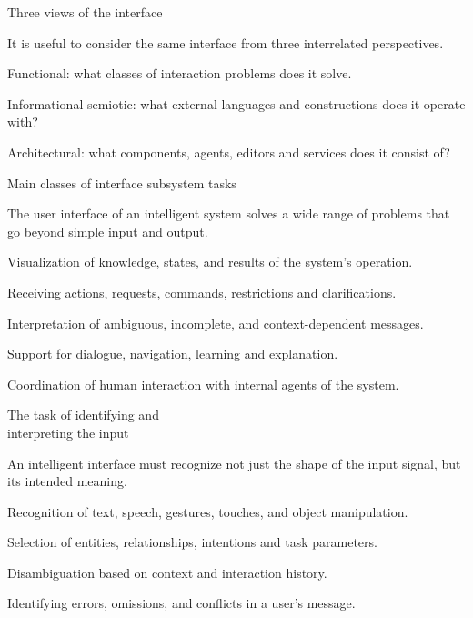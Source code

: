 \begin{frame}{Three views of the interface}
	\topline
	\justifying
	
	
	It is useful to consider the same interface from three interrelated perspectives.
	
	\begin{textitemize}
		\item Functional: what classes of interaction problems does it solve.
		\item Informational-semiotic: what external languages and constructions does it operate with?
		\item Architectural: what components, agents, editors and services does it consist of?
	\end{textitemize}
\end{frame}

\begin{frame}{Main classes of interface subsystem tasks}
	\topline
	\justifying
	
	The user interface of an intelligent system solves a wide range of problems that go beyond simple input and output.
	
	\begin{textitemize}
		\item Visualization of knowledge, states, and results of the system's operation.
		\item Receiving actions, requests, commands, restrictions and clarifications.
		\item Interpretation of ambiguous, incomplete, and context-dependent messages.
		\item Support for dialogue, navigation, learning and explanation.
		\item Coordination of human interaction with internal agents of the system.
	\end{textitemize}
\end{frame}

\begin{frame}{The task of identifying and\\ interpreting the input}
	\topline
	\justifying
	
	An intelligent interface must recognize not just the shape of the input signal, but its intended meaning.
	
	\begin{textitemize}
		\item Recognition of text, speech, gestures, touches, and object manipulation.
		\item Selection of entities, relationships, intentions and task parameters.
		\item Disambiguation based on context and interaction history.
		\item Identifying errors, omissions, and conflicts in a user's message.
	\end{textitemize}
\end{frame}

